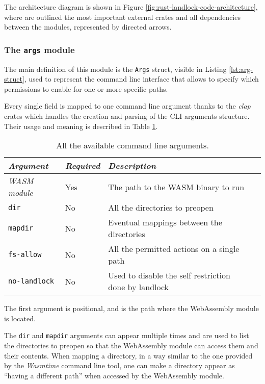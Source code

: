 \clearpage
The architecture diagram is shown in Figure \ref{fig:rust-landlock-code-architecture}, where
are outlined the most important external crates and all dependencies between the modules, represented
by directed arrows.

\subsubsection{The \texttt{args} module}
\label{sec:landlock-args-module}

The main definition of this module is the \texttt{Args} struct, visible in Listing \ref{lst:arg-struct},
used to represent the command line interface that allows to specify which permissions to enable
for one or more specific paths.

Every single field is mapped to one command line argument thanks to the \textit{clap} crates which handles the
creation and parsing of the CLI arguments structure.
Their usage and meaning is described in Table \ref{table:landlock-cli-args}.

\begin{table}
  \centering
  \begin{tabular}{|l|l|l|l|}
    \hline
    \textit{Argument} & \textit{Required} & \textit{Description} \\
    \hline\hline
    \textit{WASM module} & Yes & The path to the WASM binary to run \\ \hline
    \texttt{dir} & No & All the directories to preopen \\ \hline
    \texttt{mapdir} & No & Eventual mappings between the directories \\ \hline
    \texttt{fs-allow} & No & All the permitted actions on a single path \\ \hline
    \texttt{no-landlock} & No & Used to disable the self restriction done by landlock \\
    \hline
  \end{tabular}
  \caption{All the available command line arguments.}
  \label{table:landlock-cli-args}
\end{table}

The first argument is positional, and is the path where the WebAssembly module is located.

The \texttt{dir} and \texttt{mapdir} arguments can appear multiple times and are used to list the directories to preopen
so that the WebAssembly module can access them and their contents.
When mapping a directory, in a way similar to the one provided by the \textit{Wasmtime} command line tool, one can make a
directory appear as ``having a different path'' when accessed by the WebAssembly module.

